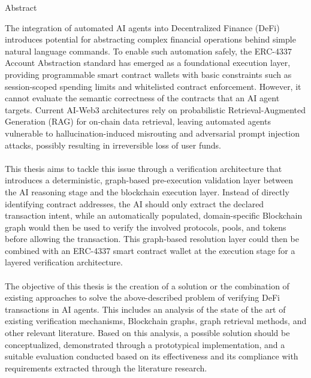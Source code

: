 \vspace*{0pt plus 1fill}
\begin{tucsimplesection}[2\bigskipamount]{Abstract}

\bigskip
The integration of automated AI agents into Decentralized Finance (DeFi) introduces potential
for abstracting complex financial operations behind simple natural language commands. To
enable such automation safely, the ERC-4337 Account Abstraction standard has emerged as a
foundational execution layer, providing programmable smart contract wallets with basic
constraints such as session-scoped spending limits and whitelisted contract enforcement.
However, it cannot evaluate the semantic correctness of the contracts that an AI agent targets.
Current AI-Web3 architectures rely on probabilistic Retrieval-Augmented Generation (RAG)
for on-chain data retrieval, leaving automated agents vulnerable to hallucination-induced
misrouting and adversarial prompt injection attacks, possibly resulting in irreversible loss of
user funds. \\ \\
This thesis aims to tackle this issue through a verification architecture that introduces a
deterministic, graph-based pre-execution validation layer between the AI reasoning stage and
the blockchain execution layer. Instead of directly identifying contract addresses, the AI should
only extract the declared transaction intent, while an automatically populated, domain-specific
Blockchain graph would then be used to verify the involved protocols, pools, and tokens
before allowing the transaction. This graph-based resolution layer could then be combined with
an ERC-4337 smart contract wallet at the execution stage for a layered verification architecture.\\ \\
The objective of this thesis is the creation of a solution or the combination of existing
approaches to solve the above-described problem of verifying DeFi transactions in AI agents.
This includes an analysis of the state of the art of existing verification mechanisms, Blockchain
graphs, graph retrieval methods, and other relevant literature. Based on this analysis, a possible
solution should be conceptualized, demonstrated through a prototypical implementation, and a
suitable evaluation conducted based on its effectiveness and its compliance with requirements
extracted through the literature research.
\end{tucsimplesection}
\vspace*{0pt plus 2.5fill}
